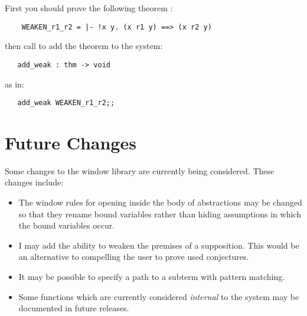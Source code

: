First you should prove the following theorem :
\begin{verbatim}
    WEAKEN_r1_r2 = |- !x y. (x r1 y) ==> (x r2 y)
\end{verbatim}
then call
to add the theorem to the system:
\begin{boxed}\begin{verbatim}
   add_weak : thm -> void
\end{verbatim}\end{boxed}
as in:
\begin{verbatim}
   add_weak WEAKEN_r1_r2;;
\end{verbatim}

\section{Future Changes}

Some changes to the window library are currently being considered.
These changes include:
\begin{itemize}
	\item	The window rules for opening inside the body of abstractions
		may be changed so that they rename
		bound variables rather than hiding assumptions in which
		the bound variables occur.
	\item	I may add the ability to weaken the premises of
		a supposition.
		This would be an alternative to compelling the user to prove
		used conjectures.
	\item	It may be possible to specify a path to a subterm with
		pattern matching.
	\item	Some functions which are currently considered {\it internal\/}
		to the system may be documented in future releases.
\end{itemize}

